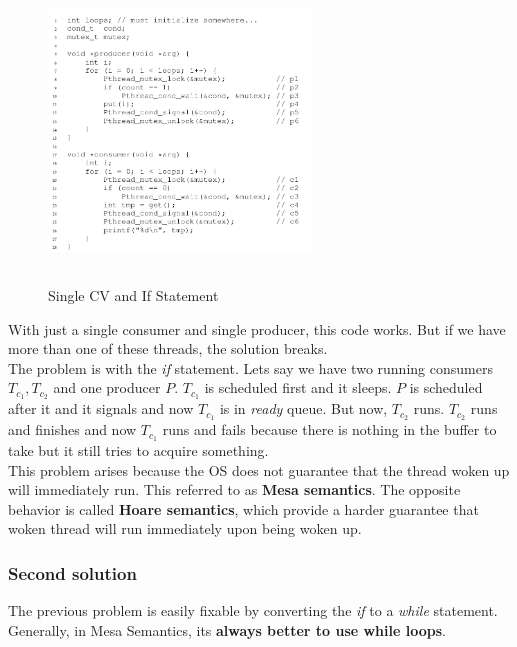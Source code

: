 \begin{figure}[h!]
    \begin{center}
        \includegraphics[width=7cm, height=8cm]{img/308.png}
        \caption{Single CV and If Statement}
    \end{center}
\end{figure}

With just a single consumer and single producer, this code works. But if we have
more than one of these threads, the solution breaks.\\

The problem is with the \textit{if} statement. Lets say we have
two running consumers $T_{c_1}, T_{c_2}$ and one producer $P$. $T_{c_1}$
is scheduled first and it sleeps. $P$ is scheduled after it and it signals
and now $T_{c_1}$ is in \textit{ready} queue. But now, $T_{c_2}$ runs.
$T_{c_2}$ runs and finishes and now $T_{c_1}$ runs and fails because there
is nothing in the buffer to take but it still tries to acquire something.\\

This problem arises because the OS does not guarantee that the thread
woken up will immediately run. This referred to as \textbf{Mesa semantics}.
The opposite behavior is called \textbf{Hoare semantics}, which provide
a harder guarantee that woken thread will run immediately upon being
woken up.

\subsubsection{Second solution}

The previous problem is easily fixable by converting the \textit{if} to a 
\textit{while} statement. Generally, in Mesa Semantics, its \textbf{always better
to use while loops}.\\

